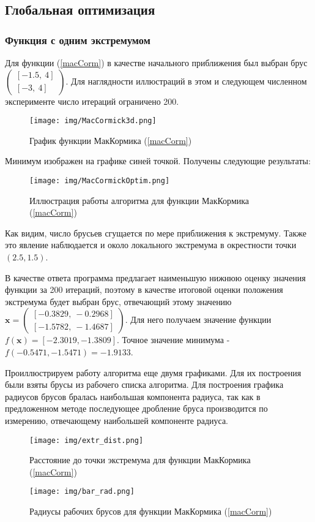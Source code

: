 \documentclass[a4paper]{article}
\begin{document}
\subsection{Глобальная оптимизация}
\subsubsection{Функция с одним экстремумом}
Для функции (\ref{macCorm}) в качестве начального приближения был выбран брус $\begin{pmatrix}
[-1.5,\: 4]\\
[-3,\: 4]
\end{pmatrix}$. Для наглядности иллюстраций в этом и следующем численном эксперименте число итераций ограничено 200.
\begin{figure}[H]
    \centering
    \texttt{[image: img/MacCormick3d.png]}
    \caption{График функции МакКормика (\ref{macCorm})}
    \label{fig:macCorm}
\end{figure}
Минимум изображен на графике синей точкой. Получены следующие результаты:
\begin{figure}[H]
    \centering
    \texttt{[image: img/MacCormickOptim.png]}
    \caption{Иллюстрация работы алгоритма для функции МакКормика (\ref{macCorm})}
    \label{fig:proc1}
\end{figure}
Как видим, число брусьев сгущается по мере приближения к экстремуму. Также это явление наблюдается и около локального экстремума в окрестности точки $(2.5,1.5)$.

В качестве ответа программа предлагает наименьшую нижнюю оценку значения функции за 200 итераций, поэтому в качестве итоговой оценки положения экстремума будет выбран брус, отвечающий этому значению $\mathbf{x}=\begin{pmatrix}
[   -0.3829,\:    -0.2968]\\ 
[   -1.5782,\:   -1.4687]
\end{pmatrix}$. Для него получаем значение функции $f(\mathbf{x})=[   -2.3019,    -1.3809]$. Точное значение минимума - $f(-0.5471, -1.5471)=-1.9133$. 

Проиллюстрируем работу алгоритма еще двумя графиками. Для их построения были взяты брусы из рабочего списка алгоритма. Для построения графика радиусов брусов бралась наибольшая компонента радиуса, так как в предложенном методе последующее дробление бруса производится по измерению, отвечающему наибольшей компоненте радиуса.
\begin{figure}[H]
    \centering
    \texttt{[image: img/extr\_dist.png]}
    \caption{Расстояние до точки экстремума для функции МакКормика (\ref{macCorm})}
    \label{fig:mcExtr}
\end{figure}
\begin{figure}[H]
    \centering
    \texttt{[image: img/bar\_rad.png]}
    \caption{Радиусы рабочих брусов для функции МакКормика (\ref{macCorm})}
    \label{fig:mcRad}
\end{figure}
\end{document}
